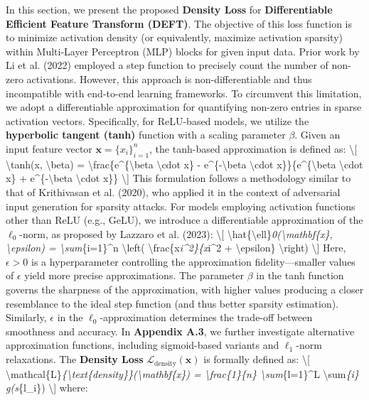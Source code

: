\documentclass[11pt,a4paper]{article}
\begin{document}
In this section, we present the proposed \textbf{Density Loss} for \textbf{Differentiable Efficient Feature Transform (DEFT)}. The objective of this loss function is to minimize activation density (or equivalently, maximize activation sparsity) within Multi-Layer Perceptron (MLP) blocks for given input data. Prior work by Li et al. (2022) employed a step function to precisely count the number of non-zero activations. However, this approach is non-differentiable and thus incompatible with end-to-end learning frameworks. To circumvent this limitation, we adopt a differentiable approximation for quantifying non-zero entries in sparse activation vectors. Specifically, for ReLU-based models, we utilize the \textbf{hyperbolic tangent (tanh)} function with a scaling parameter \(\beta\). Given an input feature vector \(\mathbf{x} = \{x_i\}_{i=1}^n\), the tanh-based approximation is defined as: \textbackslash{}[ \textbackslash{}tanh(x, \textbackslash{}beta) = \textbackslash{}frac\{e\textasciicircum{}\{\textbackslash{}beta \textbackslash{}cdot x\} - e\textasciicircum{}\{-\textbackslash{}beta \textbackslash{}cdot x\}\}\{e\textasciicircum{}\{\textbackslash{}beta \textbackslash{}cdot x\} + e\textasciicircum{}\{-\textbackslash{}beta \textbackslash{}cdot x\}\} \textbackslash{}] This formulation follows a methodology similar to that of Krithivasan et al. (2020), who applied it in the context of adversarial input generation for sparsity attacks. For models employing activation functions other than ReLU (e.g., GeLU), we introduce a differentiable approximation of the \(\ell_0\)-norm, as proposed by Lazzaro et al. (2023): \textbackslash{}[ \textbackslash{}hat\{\textbackslash{}ell\}\textit{0(\textbackslash{}mathbf\{x\}, \textbackslash{}epsilon) = \textbackslash{}sum}\{i=1\}\textasciicircum{}n \textbackslash{}left( \textbackslash{}frac\{x\textit{i\textasciicircum{}2\}\{x}i\textasciicircum{}2 + \textbackslash{}epsilon\} \textbackslash{}right) \textbackslash{}] Here, \(\epsilon > 0\) is a hyperparameter controlling the approximation fidelity—smaller values of \(\epsilon\) yield more precise approximations. The parameter \(\beta\) in the tanh function governs the sharpness of the approximation, with higher values producing a closer resemblance to the ideal step function (and thus better sparsity estimation). Similarly, \(\epsilon\) in the \(\ell_0\)-approximation determines the trade-off between smoothness and accuracy. In \textbf{Appendix A.3}, we further investigate alternative approximation functions, including sigmoid-based variants and \(\ell_1\)-norm relaxations. The \textbf{Density Loss} \(\mathcal{L}_{\text{density}}(\mathbf{x})\) is formally defined as: \textbackslash{}[ \textbackslash{}mathcal\{L\}\textit{\{\textbackslash{}text\{density\}\}(\textbackslash{}mathbf\{x\}) = \textbackslash{}frac\{1\}\{n\} \textbackslash{}sum}\{l=1\}\textasciicircum{}L \textbackslash{}sum\textit{\{i\} g(s}\{l\_i\}) \textbackslash{}] where:
\end{document}

